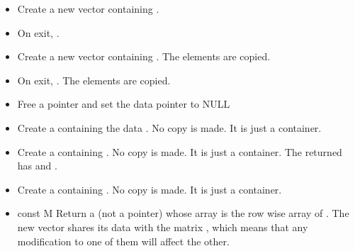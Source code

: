 \begin{itemize}
\item {}
  \sshortdescribe Create a new vector containing .

\item {}
  \sshortdescribe On exit, .

\item {}
  \sshortdescribe Create a new vector containing . The
  elements are copied.
  
\item {}
  \sshortdescribe On exit, .  The
  elements are copied.

\item {}
  \sshortdescribe Free a \PnlVect pointer and set the data pointer to NULL  
\item {}
    \sshortdescribe Create a \PnlVect containing the data 
  . No copy is made. It is just a container.
  
\item {}
  \sshortdescribe Create a \PnlVect containing
  . No copy is made. It is just a container. The returned
  \PnlVect has  and .

\item {}
  \sshortdescribe Create a \PnlVect containing . No
  copy is made. It is just a container.

\item {}
  {const \PnlMat \ptr M}
  \sshortdescribe Return a \PnlVect (not a pointer) whose array is
  the row wise array of . The new vector shares its data with the
  matrix , which means that any modification to one of them will affect
  the other.
\end{itemize}

